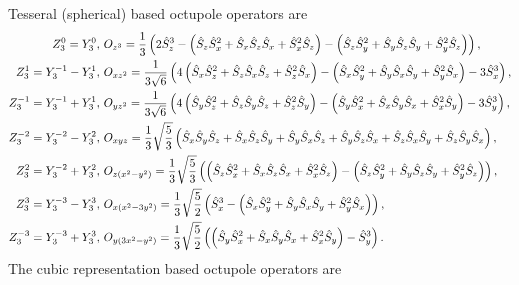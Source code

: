 \documentclass[11pt, aps, longbibliography]{article}
\begin{document}
        Tesseral (spherical) based octupole operators are
        \begin{align}\label{eq:sphe}
            Z_3^0 = Y_3^0, \  &O_{z^3} = \frac{1}{3}\left( 2\hat{S}_z^3 - \left( \hat{S}_z\hat{S}_x^2 + \hat{S}_x\hat{S}_z\hat{S}_x + \hat{S}_x^2\hat{S}_z \right) - \left( \hat{S}_z\hat{S}_y^2 + \hat{S}_y\hat{S}_z\hat{S}_y + \hat{S}_y^2\hat{S}_z \right)  \right), \notag \\
            Z_3^1 = Y_3^{-1} - Y_3^1, \  &O_{xz^2} = \frac{1}{3\sqrt{6}}\left( 4\left( \hat{S}_x\hat{S}_z^2 + \hat{S}_z\hat{S}_x\hat{S}_z + \hat{S}_z^2\hat{S}_x \right) -\left( \hat{S}_x\hat{S}_y^2 + \hat{S}_y\hat{S}_x\hat{S}_y + \hat{S}_y^2\hat{S}_x \right) -3\hat{S}_x^3 \right), \notag \\
            Z_3^{-1} = Y_3^{-1} + Y_3^1, \  &O_{yz^2} = \frac{1}{3\sqrt{6}}\left( 4\left( \hat{S}_y\hat{S}_z^2 + \hat{S}_z\hat{S}_y\hat{S}_z + \hat{S}_z^2\hat{S}_y \right) -\left( \hat{S}_y\hat{S}_x^2 + \hat{S}_x\hat{S}_y\hat{S}_x + \hat{S}_x^2\hat{S}_y \right) -3\hat{S}_y^3 \right), \notag \\
            Z_3^{-2} = Y_3^{-2} - Y_3^2, \  &O_{xyz} = \frac{1}{3}\sqrt{\frac{5}{3}} \left(\hat{S}_x\hat{S}_y\hat{S}_z + \hat{S}_x\hat{S}_z\hat{S}_y + \hat{S}_y\hat{S}_x\hat{S}_z + \hat{S}_y\hat{S}_z\hat{S}_x + \hat{S}_z\hat{S}_x\hat{S}_y + \hat{S}_z\hat{S}_y\hat{S}_x \right), \\
            Z_3^{2} = Y_3^{-2} + Y_3^2, \  &O_{z(x^2-y^2)} = \frac{1}{3}\sqrt{\frac{5}{3}} \left( \left( \hat{S}_z\hat{S}_x^2 + \hat{S}_x\hat{S}_z\hat{S}_x + \hat{S}_x^2\hat{S}_z \right) - \left( \hat{S}_z\hat{S}_y^2 + \hat{S}_y\hat{S}_z\hat{S}_y + \hat{S}_y^2\hat{S}_z \right) \right), \notag \\
            Z_3^{3} = Y_3^{-3} - Y_3^3, \  &O_{x(x^2-3y^2)} = \frac{1}{3}\sqrt{\frac{5}{2}} \left( \hat{S}_x^3 -\left( \hat{S}_x\hat{S}_y^2 + \hat{S}_y\hat{S}_x\hat{S}_y + \hat{S}_y^2\hat{S}_x \right) \right), \notag \\
            Z_3^{-3} = Y_3^{-3} + Y_3^3, \  &O_{y(3x^2-y^2)} = \frac{1}{3}\sqrt{\frac{5}{2}} \left( \left( \hat{S}_y\hat{S}_x^2 + \hat{S}_x\hat{S}_y\hat{S}_x + \hat{S}_x^2\hat{S}_y \right) - \hat{S}_y^3 \right). \notag 
        \end{align}
        The cubic representation based octupole operators are
\end{document}
